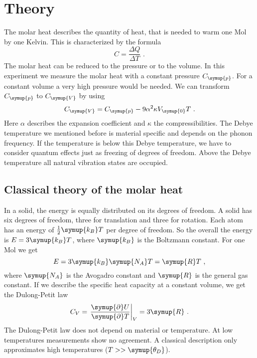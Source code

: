 \section{Theory}
\label{sec:theory}

The molar heat describes the quantity of heat, that is needed to warm one Mol by one Kelvin. This is characterized by the formula 
\begin{equation*}
    C = \frac{\Delta Q}{\Delta T} \,\, . 
\end{equation*}
The molar heat can be reduced to the pressure or to the volume. In this experiment we measure the molar heat with a constant pressure $C_{\symup{p}}$. 
For a constant volume a very high pressure would be needed. We can transform $C_{\symup{p}}$ to $C_{\symup{V}}$ by using 
\begin{equation}
    C_{\symup{V}} = C_{\symup{p}} - 9{\alpha}^2\kappa V_{\symup{0}}T \,\, .
    \label{eqn:CV}
\end{equation}
Here $\alpha$ describes the expansion coefficient and $\kappa$ the compressibilities.
The Debye temperature we mentioned before is material specific and depends on the phonon frequency. If the temperature is below this Debye temperature,
we have to consider quantum effects just as freezing of degrees of freedom. Above the Debye temperature all natural vibration states are occupied. 

\subsection{Classical theory of the molar heat}
\label{sec:classic}
In a solid, the energy is equally distributed on its degrees of freedom. A solid has six degrees of freedom, three for translation and three for rotation.
Each atom has an energy of $\frac{1}{2}\symup{k_B}T$ per degree of freedom. So the overall the energy is $E=3\symup{k_B}T$, where $\symup{k_B}$ 
is the Boltzmann constant. For one Mol we get 
\begin{equation*}
    E = 3\symup{k_B}\symup{N_A}T = \symup{R}T \,\, ,
\end{equation*}
where $\symup{N_A}$ is the Avogadro constant and $\symup{R}$ is the general gas constant. If we describe the specific heat capacity at a constant volume, 
we get the Dulong-Petit law
\begin{equation*}
    C_V = \left.\frac{\symup{\partial}U}{\symup{\partial}T}\right|_V=3 \symup{R} \,\, .
\end{equation*}
The Dulong-Petit law does not depend on material or temperature. At low temperatures measurements show no agreement. A classical description 
only approximates high temperatures ($T>> \symup{\theta_D}$).

